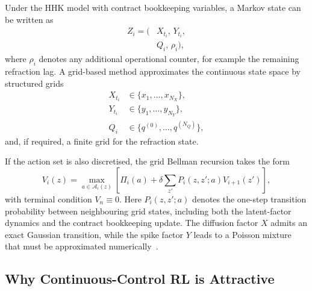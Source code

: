 \documentclass[a4paper,fleqn]{cas-dc}
\begin{document}
Under the HHK model with contract bookkeeping variables, a Markov state can be written as
\[
    \begin{aligned}
        Z_i = \bigl( & X_{t_i},\,Y_{t_i},  \\
                     & Q_i,\,\rho_i\bigr),
    \end{aligned}
\]
where $\rho_i$ denotes any additional operational counter, for example the remaining refraction lag. A grid-based method approximates the continuous state space by structured grids
\[
    \begin{aligned}
        X_{t_i} & \in \{x_1,\dots,x_{N_X}\},       \\
        Y_{t_i} & \in \{y_1,\dots,y_{N_Y}\},       \\
        Q_i     & \in \{q^{(0)},\dots,q^{(N_Q)}\},
    \end{aligned}
\]
and, if required, a finite grid for the refraction state.

If the action set is also discretised, the grid Bellman recursion takes the form
\begin{equation}
    \label{eq:grid_bellman}
    V_i(z) = \max_{a \in \mathcal{A}_i(z)}
    \left[
        \Pi_i(a)
        + \delta \sum_{z'} P_i(z,z';a) V_{i+1}(z')
        \right],
\end{equation}
with terminal condition $V_n \equiv 0$. Here $P_i(z,z';a)$ denotes the one-step transition probability between neighbouring grid states, including both the latent-factor dynamics and the contract bookkeeping update. The diffusion factor $X$ admits an exact Gaussian transition, while the spike factor $Y$ leads to a Poisson mixture that must be approximated numerically~\cite{Hambly2009}.

\subsection{Why Continuous-Control RL is Attractive}
\end{document}
